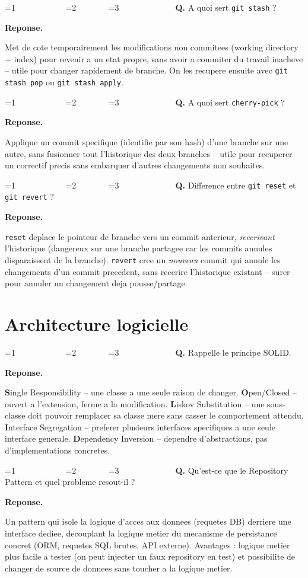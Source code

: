 \documentclass[11pt,a4paper]{article}
\newcommand{\badgeJ}{\textcolor{white}{\colorbox{junior}{\small\bfseries\ JUNIOR\ }}}
\newcommand{\badgeM}{\textcolor{white}{\colorbox{mid}{\small\bfseries\ MID\ }}}
\newcommand{\badgeS}{\textcolor{white}{\colorbox{senior}{\small\bfseries\ SENIOR\ }}}
\newcounter{qcount}
\newenvironment{qa}[2]{%
  \stepcounter{qcount}%
  \par\vspace{6pt}%
  \noindent\colorbox{qbg}{\parbox{\dimexpr\linewidth-12pt}{\vspace{2pt}%
  \ifnum#1=1 \badgeJ\fi\ifnum#1=2 \badgeM\fi\ifnum#1=3 \badgeS\fi
  \ \textbf{Q\theqcount.} #2\vspace{2pt}}}\par\vspace{4pt}%
  \noindent\textbf{\color{accent}Reponse.}\ \ignorespaces
}{%
  \par\vspace{8pt}%
}
\begin{document}
\begin{qa}{2}{A quoi sert \texttt{git stash} ?}
Met de cote temporairement les modifications non commitees (working
directory + index) pour revenir a un etat propre, sans avoir a commiter du
travail inacheve -- utile pour changer rapidement de branche. On les
recupere ensuite avec \texttt{git stash pop} ou \texttt{git stash apply}.
\end{qa}

\begin{qa}{2}{A quoi sert \texttt{cherry-pick} ?}
Applique un commit specifique (identifie par son hash) d'une branche sur une
autre, sans fusionner tout l'historique des deux branches -- utile pour
recuperer un correctif precis sans embarquer d'autres changements non
souhaites.
\end{qa}

\begin{qa}{2}{Difference entre \texttt{git reset} et \texttt{git revert} ?}
\texttt{reset} deplace le pointeur de branche vers un commit anterieur,
\emph{reecrivant} l'historique (dangereux sur une branche partagee car les
commits \og{}annules\fg{} disparaissent de la branche). \texttt{revert} cree
un \emph{nouveau} commit qui annule les changements d'un commit precedent,
sans reecrire l'historique existant -- surer pour annuler un changement deja
pousse/partage.
\end{qa}

\newpage
\section{Architecture logicielle}

\begin{qa}{2}{Rappelle le principe SOLID.}
\textbf{S}ingle Responsibility -- une classe a une seule raison de changer.
\textbf{O}pen/Closed -- ouvert a l'extension, ferme a la modification.
\textbf{L}iskov Substitution -- une sous-classe doit pouvoir remplacer sa
classe mere sans casser le comportement attendu. \textbf{I}nterface
Segregation -- preferer plusieurs interfaces specifiques a une seule
interface generale. \textbf{D}ependency Inversion -- dependre d'abstractions,
pas d'implementations concretes.
\end{qa}

\begin{qa}{2}{Qu'est-ce que le Repository Pattern et quel probleme resout-il ?}
Un pattern qui isole la logique d'acces aux donnees (requetes DB) derriere
une interface dediee, decouplant la logique metier du mecanisme de
persistance concret (ORM, requetes SQL brutes, API externe). Avantages :
logique metier plus facile a tester (on peut injecter un faux repository en
test) et possibilite de changer de source de donnees sans toucher a la
logique metier.
\end{qa}
\end{document}
